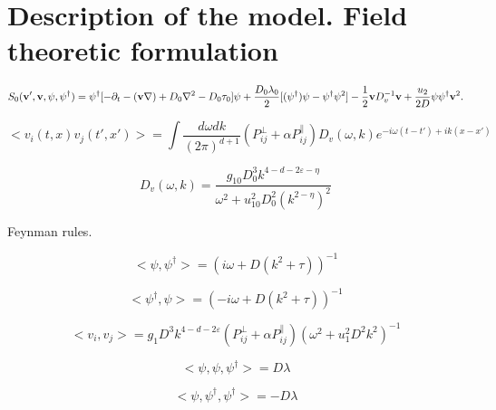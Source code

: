\documentclass[12pt]{article}
\def\epsilon{\varepsilon}
\def\bfv{{\bf v}}
\begin{document}

\section{Description of the model. Field theoretic formulation}
\label{sec:QFT}

\begin{equation}
    S_{0}(\bfv ',\bfv,\psi,\psi^{\dagger})=
    \psi^{\dagger}[-\partial_t-(\bfv\nabla)+D_{0}\nabla^2-D_{0}\tau_{0}]\psi
    +\frac{D_{0}\lambda_{0}}{2}[(\psi^{\dagger})\psi-\psi^{\dagger}\psi^2] 
    -\frac{1}{2}\bfv D^{-1}_{v}\bfv
    +\frac{u_2}{2D}\psi\psi^{\dagger}\bfv^2.
\end{equation}

\begin{equation}
    <v_{i}(t,x)v_{j}(t',x')>=\int \frac {d \omega dk}{(2\pi)^{d+1}}
    (P_{ij}^{\perp}+\alpha P_{ij}^{\parallel})D_{v}(\omega,k)e^{-i \omega (t-t')+ik(x-x')}
\end{equation}

\begin{equation}
    D_v(\omega,k) = \frac{g_{10}D^{3}_{0}k^{4-d-2\epsilon-\eta}}{\omega^2+u_{10}^{2}D_{0}^{2}(k^{2-\eta})^2} 
\end{equation}

Feynman rules.

\begin{equation}
    <\psi, \psi^{\dagger}> = (i \omega+D(k^2+\tau))^{-1}
\end{equation}

\begin{equation}
    <\psi^{\dagger}, \psi> = (-i \omega+D(k^2+\tau))^{-1}
\end{equation}

\begin{equation}
    <v_{i}, v_{j}> = 
        g_{1}D^{3}k^{4-d-2\epsilon}(P_{ij}^{\perp}+\alpha P_{ij}^{\parallel})
        (\omega^2+u_{1}^{2}D^{2}k^{2})^{-1}
\end{equation}

\begin{equation}
    <\psi, \psi, \psi^{\dagger}>= D\lambda
\end{equation}

\begin{equation}
    <\psi, \psi^{\dagger}, \psi^{\dagger}>= -D\lambda
\end{equation}
\end{document}

